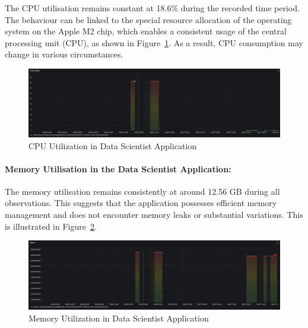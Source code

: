 \documentclass{ieeeaccess}
\begin{document}
The CPU utilisation remains constant at 18.6\% during the recorded time period. The behaviour can be linked to the special resource allocation of the operating system on the Apple M2 chip, which enables a consistent usage of the central processing unit (CPU), as shown in Figure~\ref{cpuUtilizationInDataScientistApplication}. As a result, CPU consumption may change in various circumstances.

\begin{figure}[h]

  \centering

  \includegraphics[width=\textwidth]{images/CPU-utilization-data-scientist-application.png}

  \caption{CPU Utilization in Data Scientist Application}

  \label{cpuUtilizationInDataScientistApplication}

\end{figure}

\paragraph{Memory Utilisation in the Data Scientist Application:}

The memory utilisation remains consistently at around 12.56 GB during all observations. This suggests that the application possesses efficient memory management and does not encounter memory leaks or substantial variations. This is illustrated in Figure~\ref{memoryUtilizationInDataScientistApplication}.

\begin{figure}[h]

  \centering

  \includegraphics[width=\textwidth]{images/memory-utilization-in-data-scientist-application.png}

  \caption{Memory Utilization in Data Scientist Application}

  \label{memoryUtilizationInDataScientistApplication}

\end{figure}
\end{document}
